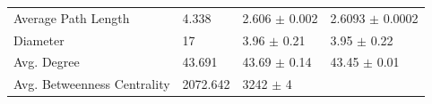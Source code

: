 \documentclass[12pt,twoside]{amherstthesis}
\begin{document}
\begin{longtable}[]{@{}llll@{}}
\begin{minipage}[t]{0.27\columnwidth}
  Average Path Length\strut
  \end{minipage} & \begin{minipage}[t]{0.11\columnwidth}\raggedright\strut
  4.338\strut
  \end{minipage} & \begin{minipage}[t]{0.25\columnwidth}\raggedright\strut
  2.606 \(\pm\) 0.002\strut
  \end{minipage} & \begin{minipage}[t]{0.25\columnwidth}\raggedright\strut
  2.6093 \(\pm\) 0.0002\strut
  \end{minipage}\tabularnewline
  \begin{minipage}[t]{0.27\columnwidth}\raggedright\strut
  Diameter\strut
  \end{minipage} & \begin{minipage}[t]{0.11\columnwidth}\raggedright\strut
  17\strut
  \end{minipage} & \begin{minipage}[t]{0.25\columnwidth}\raggedright\strut
  3.96 \(\pm\) 0.21\strut
  \end{minipage} & \begin{minipage}[t]{0.25\columnwidth}\raggedright\strut
  3.95 \(\pm\) 0.22\strut
  \end{minipage}\tabularnewline
  \begin{minipage}[t]{0.27\columnwidth}\raggedright\strut
  Avg. Degree\strut
  \end{minipage} & \begin{minipage}[t]{0.11\columnwidth}\raggedright\strut
  43.691\strut
  \end{minipage} & \begin{minipage}[t]{0.25\columnwidth}\raggedright\strut
  43.69 \(\pm\) 0.14\strut
  \end{minipage} & \begin{minipage}[t]{0.25\columnwidth}\raggedright\strut
  43.45 \(\pm\) 0.01\strut
  \end{minipage}\tabularnewline
  \begin{minipage}[t]{0.27\columnwidth}\raggedright\strut
  Avg. Betweenness Centrality\strut
  \end{minipage} & \begin{minipage}[t]{0.11\columnwidth}\raggedright\strut
  2072.642\strut
  \end{minipage} & \begin{minipage}[t]{0.25\columnwidth}\raggedright\strut
  3242 \(\pm\) 4\strut
  \end{minipage} & \begin{minipage}[t]{0.25\columnwidth}\raggedright\strut

\end{minipage}
\end{longtable}
\end{document}
